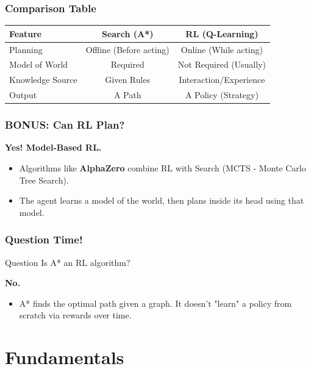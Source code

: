 \documentclass[aspectratio=169]{beamer}
\begin{document}
\begin{frame}
    \frametitle{Comparison Table}
    \begin{center}
    \begin{tabular}{lcc}
        \toprule
        \textbf{Feature} & \textbf{Search (A*)} & \textbf{RL (Q-Learning)} \\
        \midrule
        Planning & Offline (Before acting) & Online (While acting) \\
        Model of World & Required & Not Required (Usually) \\
        Knowledge Source & Given Rules & Interaction/Experience \\
        Output & A Path & A Policy (Strategy) \\
        \bottomrule
    \end{tabular}
    \end{center}
\end{frame}

\begin{frame}
    \frametitle{BONUS: Can RL Plan?}
    \textbf{Yes! Model-Based RL.}
    \vspace{0.5cm}
    \begin{itemize}
        \item Algorithms like \textbf{AlphaZero} combine RL with Search (MCTS - Monte Carlo Tree Search).
        \item The agent learns a model of the world, then plans inside its head using that model.
    \end{itemize}
\end{frame}

\begin{frame}
    \frametitle{Question Time!}
    \begin{alertblock}{Question}
        Is A* an RL algorithm?
    \end{alertblock}
    \pause
    \textbf{No.}
    \begin{itemize}
        \item A* finds the optimal path given a graph. It doesn't "learn" a policy from scratch via rewards over time.
    \end{itemize}
\end{frame}

\section{Fundamentals}
\end{document}

